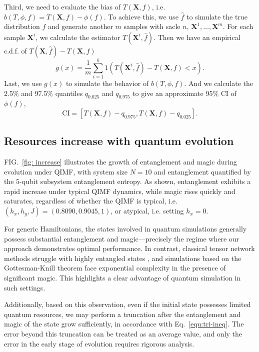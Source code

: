 \documentclass[showpacs,amsmath,amssymb,twocolumn,aps,pra,superscriptaddress,notitlepage,10pt]{revtex4-2}
\begin{document}
Third, we need to evaluate the bias of $T(\mathbf X,f)$, i.e. $b(T,\phi,f)=T(\mathbf X,f)-\phi(f)$. To achieve this, we use $\hat f$ to simulate the true distribution $f$ and generate another $m$ samples with sacle $n$, $\mathbf{X}^1,\dots,\mathbf{X}^m$. For each sample $\mathbf{X}^i$, we calculate the estimator $T(\mathbf{X}^i,\hat f)$. Then we have an empirical c.d.f. of $T(\mathbf X,\hat f)-T(\mathbf X,f)$
\begin{equation}
    g(x)=\frac{1}{m}\sum_{i=1}^b1\left(T(\mathbf{X}^i,\hat f)-T(\mathbf X,f)<x\right).
\end{equation}
Last, we use $g(x)$ to simulate the behavior of $b(T,\phi,f)$. And we calculate the 2.5\% and 97.5\% quantiles $q_{0.025}$ and $q_{0.975}$ to give an approximate 95\% CI of $\phi(f)$,
\begin{equation}
    \mathrm{CI}=[T(\mathbf{X},f)-q_{0.975},T(\mathbf{X},f)-q_{0.025}].
\end{equation}

\subsection{Resources increase with quantum evolution}
FIG.~\ref{fig: increase} illustrates the growth of entanglement and magic during evolution under QIMF, with system size $N=10$ and entanglement quantified by the $5$-qubit subsystem entanglement entropy. As shown, entanglement exhibits a rapid increase under typical QIMF dynamics, while magic rises quickly and saturates, regardless of whether the QIMF is typical, i.e. $(h_x, h_y, J) = (0.8090, 0.9045, 1)$, or atypical, i.e. setting $h_x=0$.

For generic Hamiltonians, the states involved in quantum simulations generally possess substantial entanglement and magic—precisely the regime where our approach demonstrates optimal performance. In contrast, classical tensor network methods struggle with highly entangled states \cite{tensornetworkandentanglement2019}, and simulations based on the Gottesman-Knill theorem \cite{gottesman1998heisenbergrepresentationquantumcomputers} face exponential complexity in the presence of significant magic. This highlights a clear advantage of quantum simulation in such settings.

Additionally, based on this observation, even if the initial state possesses limited quantum resources, we may perform a truncation after the entanglement and magic of the state grow sufficiently, in accordance with Eq.~\eqref{equ:tri-ineq}. The error beyond this truncation can be treated as an average value, and only the error in the early stage of evolution requires rigorous analysis.
\end{document}
